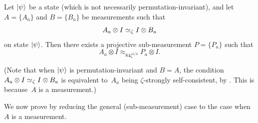\begin{lemma}\label{lem:orthonormalization-main-lemma}
Let $\ket{\psi}$ be a state (which is not necessarily permutation-invariant),
and let $A = \{A_a\}$ and $B = \{B_a\}$ be measurements such that
\begin{equation*}
A_a \otimes I \simeq_{\zeta} I \otimes B_a
\end{equation*}
on state $\ket{\psi}$.
Then there exists a projective sub-measurement $P = \{P_a\}$ such that
\begin{equation*}
A_a \otimes I \approx_{84 \zeta^{1/4}} P_a \otimes I.
\end{equation*}
\end{lemma}

(Note that when $\ket{\psi}$ is permutation-invariant and $B = A$, the condition $A_a \otimes I \simeq_{\zeta} I \otimes B_a$
is equivalent to~$A_a$ being $\zeta$-strongly self-consistent, by .
This is because~$A$ is a measurement.)



We now prove  by reducing the general (sub-measurement) case
to the case when~$A$ is a measurement.

